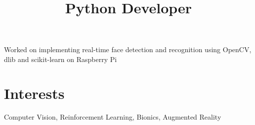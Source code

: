 \documentclass[margin]{res}
\begin{document}
\begin{resume}
      \title{\textbf{Python Developer}}
      \begin{position}
        Worked on implementing real-time face detection and recognition using OpenCV, dlib and scikit-learn on Raspberry Pi
      \end{position}


    \section{Interests}
      Computer Vision, Reinforcement Learning, Bionics, Augmented Reality

  \end{resume}
\end{document}
